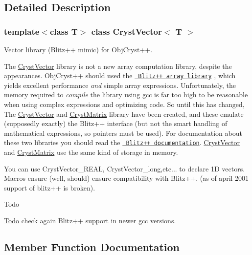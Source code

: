 \subsection{Detailed Description}
\subsubsection*{template$<$class T$>$\newline
class Cryst\+Vector$<$ T $>$}

Vector library (Blitz++ mimic) for Obj\+Cryst++. 

The \mbox{\hyperlink{class_cryst_vector}{Cryst\+Vector}} library is not a new array computation library, despite the appearances. Obj\+Cryst++ should used the \href{http://www.oonumerics.org/blitz/}{\texttt{ Blitz++ array library}} , which yields excellent performance {\itshape and} simple array expressions. Unfortunately, the memory required to {\itshape compile} the library using gcc is far too high to be reasonable when using complex expressions and optimizing code. So until this has changed, The \mbox{\hyperlink{class_cryst_vector}{Cryst\+Vector}} and \mbox{\hyperlink{class_cryst_matrix}{Cryst\+Matrix}} library have been created, and these emulate (supposedly exactly) the Blitz++ interface (but not the smart handling of mathematical expressions, so pointers must be used). For documentation about these two libraries you should read the \href{http://www.oonumerics.org/blitz/manual/}{\texttt{ Blitz++ documentation}}. \mbox{\hyperlink{class_cryst_vector}{Cryst\+Vector}} and \mbox{\hyperlink{class_cryst_matrix}{Cryst\+Matrix}} use the same kind of storage in memory.

You can use Cryst\+Vector\+\_\+\+R\+E\+AL, Cryst\+Vector\+\_\+long,etc... to declare 1D vectors. Macros ensure (well, should) ensure compatibility with Blitz++. (as of april 2001 support of blitz++ is broken).

\begin{DoxyRefDesc}{Todo}
\item[\mbox{\hyperlink{todo__todo000001}{Todo}}]check again Blitz++ support in newer gcc versions. \end{DoxyRefDesc}


\subsection{Member Function Documentation}
\mbox{\label{class_cryst_vector_a9f939ab8555eaa1ef838ad5b25dde2d8}} 

